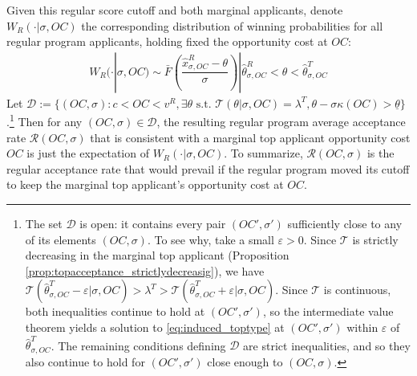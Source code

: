 \documentclass[12pt,reqno]{amsart}
\theoremstyle{definition}
\theoremstyle{plain} %
\begin{document}
Given this regular score cutoff and both marginal applicants, denote $W_R(\cdot|\sigma,OC)$ the corresponding distribution of winning probabilities for all regular program applicants, holding fixed the opportunity cost at $OC$:
\begin{align}\label{eq:reg_winning_distribution}
    W_R(\cdot|\sigma,OC) \sim \bar{F}\left(\dfrac{\hat{x}^R_{\sigma,OC} - \theta}{\sigma}\right)| \hat{\theta}^R_{\sigma,OC} < \theta < \hat{\theta}^T_{\sigma,OC}
\end{align}
Let $\mathcal{D} := \{(OC,\sigma):c<OC<v^R,\exists \theta \text{ s.t. }\mathcal{T}(\theta|\sigma,OC)=\lambda^T, \theta-\sigma \kappa(OC)>\underline{\theta}\}$.\footnote{The set $\mathcal{D}$ is open: it contains every pair $(OC',\sigma')$ sufficiently close to any of its elements $(OC,\sigma)$. To see why, take a small $\varepsilon>0$. Since $\mathcal{T}$ is strictly decreasing in the marginal top applicant (Proposition \ref{prop:topacceptance_strictlydecreasig}), we have $\mathcal{T}(\hat{\theta}^T_{\sigma,OC}-\varepsilon|\sigma,OC)>\lambda^T>\mathcal{T}(\hat{\theta}^T_{\sigma,OC}+\varepsilon|\sigma,OC)$. Since $\mathcal{T}$ is continuous, both inequalities continue to hold at $(OC',\sigma')$, so the intermediate value theorem yields a solution to \eqref{eq:induced_toptype} at $(OC',\sigma')$ within $\varepsilon$ of $\hat{\theta}^T_{\sigma,OC}$. The remaining conditions defining $\mathcal{D}$ are strict inequalities, and so they also continue to hold for $(OC',\sigma')$ close enough to $(OC,\sigma)$.} Then for any $(OC,\sigma)\in \mathcal{D}$, the resulting regular program average acceptance rate $\mathcal{R}(OC,\sigma)$ that is consistent with a marginal top applicant opportunity cost $OC$ is just the expectation of $W_R(\cdot|\sigma,OC)$. To summarize, $\mathcal{R}(OC,\sigma)$ is the regular acceptance rate that would prevail if the regular program moved its cutoff to keep the marginal top applicant's opportunity cost at $OC$.
\end{document}
